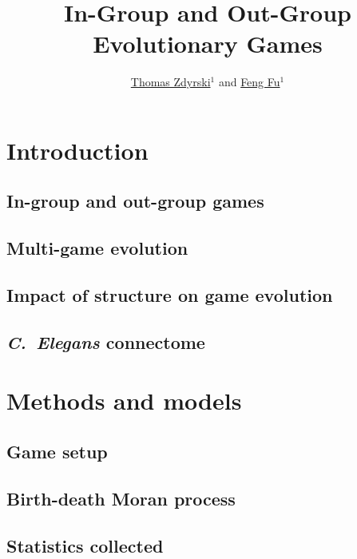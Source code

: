 \documentclass[pdflatex,lineno,referee,sn-mathphys-ay]{class/sn-jnl}
\begin{document}
\title{In-Group and Out-Group Evolutionary Games}

\author{
\href{https://orcid.org/0000-0003-3039-172X}{Thomas Zdyrski}$^{1}$
and
\href{https://orcid.org/0000-0001-8252-1990}{Feng Fu}$^{1}$
}




\maketitle
\tableofcontents

\section{Introduction}
\subsection{In-group and out-group games}
\subsection{Multi-game evolution}
\subsection{Impact of structure on game evolution}
\subsection{\emph{C.\ Elegans} connectome}

\section{Methods and models}
\subsection{Game setup}
\subsection{Birth-death Moran process}
\subsection{Statistics collected}
\end{document}
